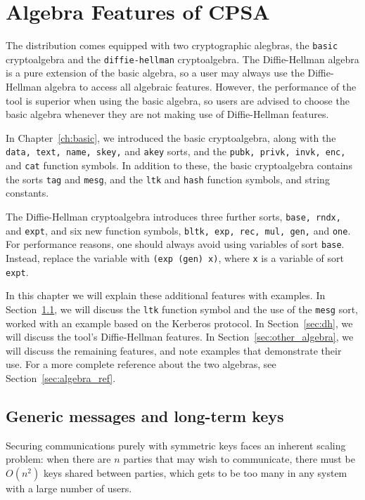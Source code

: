 \chapter{Algebra Features of CPSA}
\label{ch:algebra}

The {\cpsa} distribution comes equipped with two cryptographic
alegbras, the \texttt{basic} cryptoalgebra and the
\texttt{diffie-hellman} cryptoalgebra.  The Diffie-Hellman algebra is
a pure extension of the basic algebra, so a user may always use the
Diffie-Hellman algebra to access all algebraic features.  However, the
performance of the tool is superior when using the basic algebra, so
users are advised to choose the basic algebra whenever they are not
making use of Diffie-Hellman features.

In Chapter~\ref{ch:basic}, we introduced the basic cryptoalgebra,
along with the \texttt{data, text, name, skey,} and \texttt{akey}
sorts, and the \texttt{pubk, privk, invk, enc,} and \texttt{cat}
function symbols.  In addition to these, the basic cryptoalgebra
contains the sorts  \texttt{tag} and \texttt{mesg}, and the \texttt{ltk}
and \texttt{hash} function symbols, and string constants.

The Diffie-Hellman cryptoalgebra introduces three further sorts,
\texttt{base, rndx,} and \texttt{expt}, and six new function symbols,
\texttt{bltk, exp, rec, mul, gen,} and \texttt{one}.  For performance
reasons, one should always avoid using variables of sort
\texttt{base}.  Instead, replace the variable with \texttt{(exp (gen)
  x)}, where \texttt{x} is a variable of sort \texttt{expt}.

In this chapter we will explain these additional features with
examples.  In Section~\ref{sec:kerberos}, we will discuss the
\texttt{ltk} function symbol and the use of the \texttt{mesg} sort,
worked with an example based on the Kerberos protocol.  In
Section~\ref{sec:dh}, we will discuss the tool's Diffie-Hellman
features.  In Section~\ref{sec:other_algebra}, we will discuss the
remaining features, and note examples that demonstrate their use.
For a more complete reference about the two algebras, see Section~\ref{sec:algebra_ref}.

\section{Generic messages and long-term keys}
\label{sec:kerberos}

Securing communications purely with symmetric keys faces an inherent
scaling problem: when there are $n$ parties that may wish to
communicate, there must be $O(n^2)$ keys shared between parties, which
gets to be too many in any system with a large number of users.

